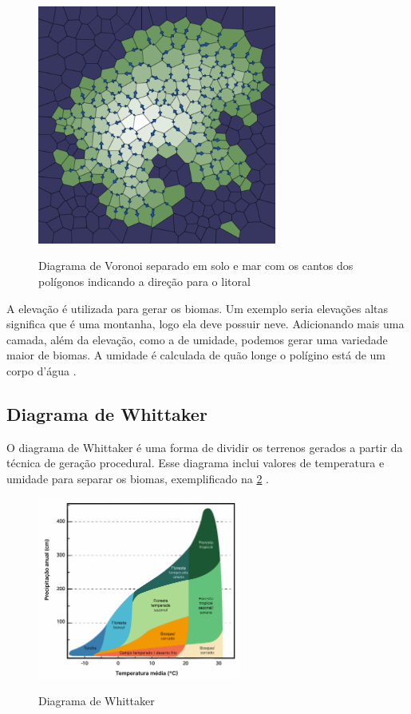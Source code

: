 \begin{figure}[ht]
	\caption{Diagrama de Voronoi separado em solo e mar com os cantos dos polígonos indicando a direção para o litoral}
	\centering
	\includegraphics[width=0.7\textwidth]{figures/downslopes.png}
	\label{fig:downslopes}
\end{figure}

A elevação é utilizada para gerar os biomas. Um exemplo seria elevações altas significa que é uma montanha, logo ela deve possuir neve. Adicionando mais uma camada, além da elevação, como a de umidade, podemos gerar uma variedade maior de biomas. A umidade é calculada de quão longe o polígino está de um corpo d'água \cite{amitp2010}.

\subsection*{Diagrama de Whittaker}

O diagrama de Whittaker é uma forma de dividir os terrenos gerados a partir da técnica de geração procedural. Esse diagrama inclui valores de temperatura e umidade para separar os biomas, exemplificado na \cref{fig:diagrama-whittaker} \cite{wikidotwhittakerdiagram}.

\begin{figure}[ht]
	\caption{Diagrama de Whittaker}
	\centering
	\includegraphics[width=0.6\textwidth]{figures/diagrama-whittaker.png}
	\label{fig:diagrama-whittaker}
\end{figure}

